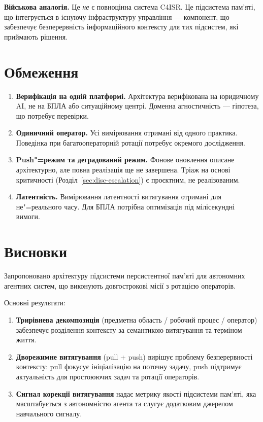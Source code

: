 \documentclass[11pt]{article}
\begin{document}
\textbf{Військова аналогія.}
Це \emph{не} є повноцінна система C4ISR.
Це підсистема пам'яті, що інтегрується в існуючу інфраструктуру управління --- компонент, що забезпечує безперервність інформаційного контексту для тих підсистем, які приймають рішення.


\section{Обмеження}
\label{sec:limitations}

\begin{enumerate}[label=(\roman*), nosep]
  \item \textbf{Верифікація на одній платформі.} Архітектура верифікована на юридичному AI, не на БПЛА або ситуаційному центрі. Доменна агностичність --- гіпотеза, що потребує перевірки.
  \item \textbf{Одиничний оператор.} Усі вимірювання отримані від одного практика. Поведінка при багатооператорній ротації потребує окремого дослідження.
  \item \textbf{Push"=режим та деградований режим.} Фонове оновлення описане архітектурно, але повна реалізація ще не завершена. Тріаж на основі критичності (Розділ~\ref{sec:disc-escalation}) є проєктним, не реалізованим.
  \item \textbf{Латентність.} Вимірювання латентності витягування отримані для не"=реального часу. Для БПЛА потрібна оптимізація під мілісекундні вимоги.
\end{enumerate}


\section{Висновки}
\label{sec:conclusion}

Запропоновано архітектуру підсистеми персистентної пам'яті для автономних агентних систем, що виконують довгострокові місії з ротацією операторів.

Основні результати:
\begin{enumerate}[nosep]
  \item \textbf{Трирівнева декомпозиція} (предметна область / робочий процес / оператор) забезпечує розділення контексту за семантикою витягування та терміном життя.
  \item \textbf{Дворежимне витягування} (pull + push) вирішує проблему безперервності контексту: pull фокусує ініціалізацію на поточну задачу, push підтримує актуальність для простоюючих задач та ротації операторів.
  \item \textbf{Сигнал корекції витягування} надає метрику якості підсистеми пам'яті, яка масштабується з автономністю агента та слугує додатковим джерелом навчального сигналу.
\end{enumerate}
\end{document}
